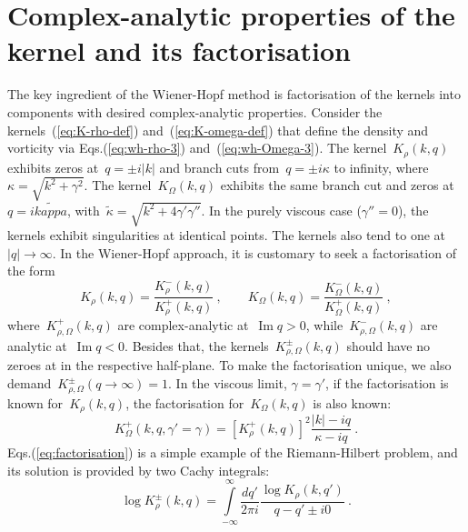 \documentclass[preprint,aps,eqsecnum, prb]{revtex4-1}
\newcommand{\fplus}[1]{{#1}^{+}}
\newcommand{\fminus}[1]{{#1}^{-}}
\newcommand{\fplusminus}[1]{{#1}^{\pm}}
\renewcommand{\Im}{\mathop{\mathrm{Im}}\nolimits}
\begin{document}
\section{Complex-analytic properties of the kernel and its factorisation}
\label{sec:factorisation}
The key ingredient of the Wiener-Hopf method is factorisation of the kernels
into components with desired complex-analytic properties.
Consider the kernels~(\ref{eq:K-rho-def}) and~(\ref{eq:K-omega-def})
that define the density and vorticity via Eqs.(\ref{eq:wh-rho-3})
and~(\ref{eq:wh-Omega-3}).
The  kernel~$K_\rho(k, q)$ exhibits zeros at~$q = \pm i |k|$ and branch cuts
from~$q = \pm i \kappa$ to infinity, where~$\kappa = \sqrt{k^2 + \gamma^2}$.
The kernel~$K_\Omega(k, q)$ exhibits the same branch cut
and zeros at~$q = i \tilde{kappa}$,
with~${\tilde\kappa} = \sqrt{k^2 + 4 \gamma'\gamma''} $.
In the purely viscous case ($\gamma'' = 0$), the kernels exhibit
singularities at identical points.
The kernels also
tend to one at~$|q| \to \infty$. In the Wiener-Hopf approach, it is
customary to seek a factorisation of the form
\begin{equation}
  \label{eq:factorisation}
  K_\rho(k, q) = \frac{\fminus{K}_\rho(k, q)}{\fplus{K}_\rho(k, q)}
  \ ,
  \qquad
  K_\Omega(k, q) = \frac{\fminus{K}_\Omega(k, q)}{\fplus{K}_\Omega(k, q)}
  \ ,
\end{equation}
where~$\fplus{K}_{\rho, \Omega}(k, q)$ are complex-analytic at~$\Im q > 0$,
while~$\fminus{K}_{\rho, \Omega}(k, q)$ are analytic at~$\Im q < 0$.
Besides that, the kernels~$\fplusminus{K}_{\rho, \Omega}(k, q)$ should have no
zeroes at in the respective half-plane.
To make the factorisation unique, we also
demand~$\fplusminus{K}_{\rho, \Omega}(q\to \infty) = 1$.
In the viscous limit, $\gamma = \gamma'$,
if the factorisation is known for~$K_\rho(k, q)$,
 the factorisation for~$K_\Omega(k, q)$ is also known:
\begin{equation}
  \fplus{K}_\Omega(k, q, \gamma'=\gamma) = \left[\fplus{K}_\rho(k, q)\right]^2
                              \frac{|k| - iq}{\kappa - iq}
  \ .
\end{equation}
Eqs.(\ref{eq:factorisation})  is  a simple example of
the Riemann-Hilbert problem, and its solution is provided by two Cachy integrals:
\begin{equation}
  \label{eq:factor-cauchy}
  \log\fplusminus{K}_\rho(k, q)
  = \int\limits_{-\infty}^{\infty} \frac{dq'}{2\pi i}
    \frac{\log K_\rho(k, q') }{q - q' \pm i0}
  \ .
\end{equation}
\end{document}
